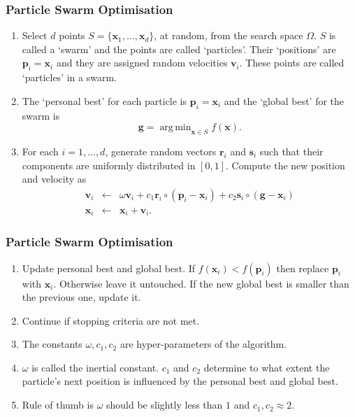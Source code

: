 \documentclass{beamer}
\DeclareMathOperator*{\argmin}{arg\,min}
\begin{document}
\begin{frame}
\frametitle{Particle Swarm Optimisation}
\begin{enumerate}
\item Select $d$ points $S = \{\bm{x}_1, \ldots, \bm{x}_d\}$, at random, from the 
search space $\Omega$. $S$ is called a `swarm' and the points are called 
`particles'. Their `positions' are $\bm{p}_i = \bm{x}_i$ and they are assigned
random velocities $\bm{v}_i$. These points are called `particles' in a swarm.
\item The `personal best' for each particle is $\bm{p}_i = \bm{x}_i$ and the 
`global best' for the swarm is
\begin{equation}\label{e4}
\bm{g} = \argmin_{\bm{x} \in S}f(\bm{x}).
\end{equation}
\item For each $i = 1, \ldots, d$, generate random vectors $\bm{r}_i$ and 
$\bm{s}_i$ such that their components are uniformly distributed in $[0, 1]$.
Compute the new position and velocity as
\begin{eqnarray}
\bm{v}_i &\leftarrow& \omega\bm{v}_i + c_1\bm{r}_i \circ (\bm{p}_i - \bm{x}_i) +
c_2\bm{s}_i \circ (\bm{g} - \bm{x}_i) \label{e5} \\
\bm{x}_i &\leftarrow& \bm{x}_i + \bm{v}_i. \label{e6}
\end{eqnarray}
\end{enumerate}
\end{frame}

\begin{frame}
\frametitle{Particle Swarm Optimisation}
\begin{enumerate}
\item Update personal best and global best. If $f(\bm{x}_i) < f(\bm{p}_i)$ then
replace $\bm{p}_i$ with $\bm{x}_i$. Otherwise leave it untouched. If the new
global best is smaller than the previous one, update it.
\item Continue if stopping criteria are not met.
\item The constants $\omega, c_1, c_2$ are hyper-parameters of the algorithm.
\item $\omega$ is called the inertial constant. $c_1$ and $c_2$ determine to what 
extent the particle's next position is influenced by the personal best and global
best.
\item Rule of thumb is $\omega$ should be slightly less than $1$ and $c_1, c_2
\approx 2$.
\end{enumerate}
\end{frame}
\end{document}
